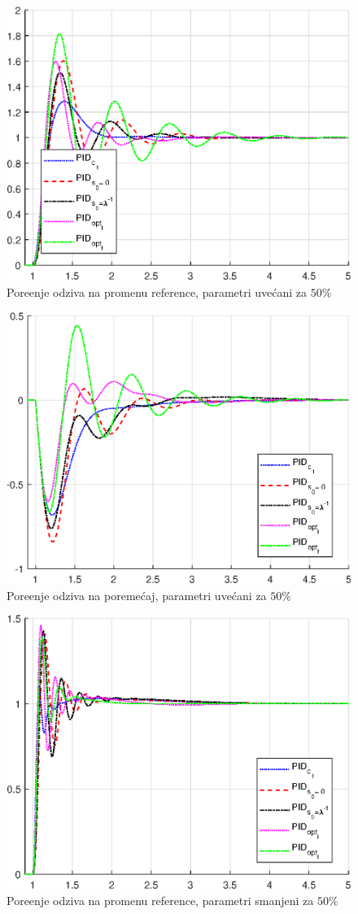\documentclass[a4paper,11pt]{article}
\theoremstyle{definition} \newtheorem{deff}{Definicija}[section]
\theoremstyle{definition} \newtheorem{prim}[deff]{Primer}
\theoremstyle{plain} \newtheorem{teor}[deff]{Teorema}
\begin{document}
	\begin{figure}[!h]
		\centering
		\includegraphics[width=0.6\linewidth]{slike/Pg_comparison_+50.eps}
		\caption{Pore\dj{}enje odziva na promenu reference, parametri uve\'cani za $50\%$}
		\label{fig:Pg_50}
	\end{figure}
	
	\begin{figure}[!h]
		\centering
		\includegraphics[width=0.6\linewidth]{slike/fm_comparison_+50.eps}
		\caption{Pore\dj{}enje odziva na poreme\'caj, parametri uve\'cani za $50\%$}
		\label{fig:fm_50}
	\end{figure}
	
\begin{figure}[!h]
	\centering
	\includegraphics[width=0.6\linewidth]{slike/Pg_comparison_-50.eps}
	\caption{Pore\dj{}enje odziva na promenu reference, parametri smanjeni za $50\%$}
	\label{fig:Pg_-50}
\end{figure}
\end{document}
